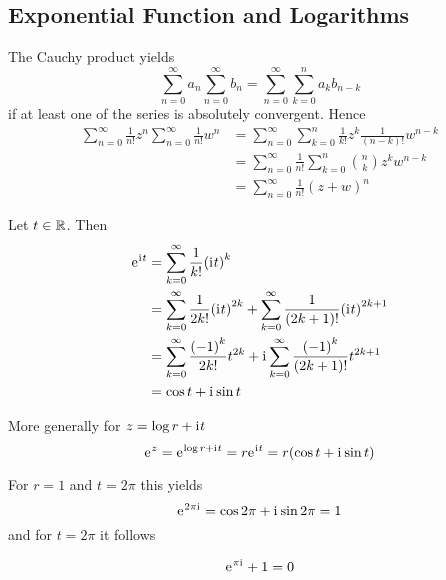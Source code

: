 \subsection{Exponential Function and Logarithms}
\bigskip

\begin{exercise}
	The Cauchy product yields
	\[
		\sum_{n=0}^\infty a_n \sum_{n=0}^\infty b_n = \sum_{n=0}^\infty \sum_{k=0}^n a_k b_{n-k}
	\]
	if at least one of the series is absolutely convergent. Hence
	\[
		\begin{split}
			\sum_{n=0}^\infty \frac{1}{n!} z^n \sum_{n=0}^\infty \frac{1}{n!} w^n
			& = \sum_{n=0}^{\infty} \sum_{k=0}^{n} \frac{1}{k!} z^{k} \frac{1}{(n - k)!} w^{n - k} \\
			& = \sum_{n=0}^{\infty} \frac{1}{n!} \sum_{k=0}^{n} \binom{n}{k} z^{k}w^{n - k} \\
			& = \sum_{n=0}^\infty \frac{1}{n!} {(z + w)}^n
		\end{split}
	\]
\end{exercise}
\bigskip


Let \( t \in \mathbb{R} \). Then
\[
	\begin{split}
		\mathrm{e}\mkern1mu^{\mathrm{i}\mkern1mu t}
		& = \sum_{k=0}^\infty \frac{1}{k!} {(\mathrm{i}\mkern1mu t)}^k \\
		& = \sum_{k=0}^\infty \frac{1}{2k!} {(\mathrm{i}\mkern1mu t)}^{2k} +
		\sum_{k=0}^\infty \frac{1}{(2k + 1)!} {(\mathrm{i}\mkern1mu t)}^{2k + 1} \\
		& = \sum_{k=0}^\infty \frac{{(-1)}^k}{2k!} t^{2k} +
		\mathrm{i}\mkern1mu\sum_{k=0}^\infty \frac{{(-1)}^k}{(2k + 1)!} t^{2k + 1} \\
		& = \cos{t} + \mathrm{i}\mkern1mu\sin{t}
	\end{split}
\]

More generally for \( z = \log r + \mathrm{i}\mkern1mu t\)
\[
	\mathrm{e}\mkern1mu^z = \mathrm{e}\mkern1mu^{\log r + \mathrm{i}\mkern1mu t} = r\mathrm{e}\mkern1mu^{\mathrm{i}\mkern1mu t} = r(\cos{t} + \mathrm{i}\mkern1mu\sin{t})
\]

For \( r = 1 \) and \( t = 2\pi \) this yields
\[
	\mathrm{e}\mkern1mu^{2\pi\mathrm{i}\mkern1mu} = \cos{2\pi} + \mathrm{i}\mkern1mu \sin{2\pi} = 1
\]
and for \( t = 2\pi \) it follows
\bigskip

\begin{lemma}\label{lemma:lemma_euler_equation}
	\[
		\mathrm{e}\mkern1mu^{\pi\mathrm{i}\mkern1mu} + 1 = 0
	\]
\end{lemma}
\bigskip


